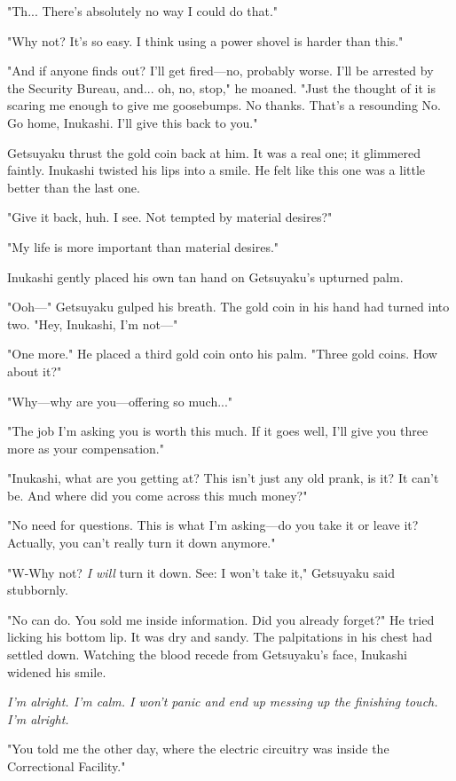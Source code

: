 "Th... There's absolutely no way I could do that."

"Why not? It's so easy. I think using a power shovel is harder than
this."

"And if anyone finds out? I'll get fired---no, probably worse. I'll be
arrested by the Security Bureau, and... oh, no, stop," he moaned. "Just
the thought of it is scaring me enough to give me goosebumps. No thanks.
That's a resounding No. Go home, Inukashi. I'll give this back to you."

Getsuyaku thrust the gold coin back at him. It was a real one; it
glimmered faintly. Inukashi twisted his lips into a smile. He felt like
this one was a little better than the last one.

"Give it back, huh. I see. Not tempted by material desires?"

"My life is more important than material desires."

Inukashi gently placed his own tan hand on Getsuyaku's upturned palm.

"Ooh---" Getsuyaku gulped his breath. The gold coin in his hand had turned
into two. "Hey, Inukashi, I'm not---"

"One more." He placed a third gold coin onto his palm. "Three gold
coins. How about it?"

"Why---why are you---offering so much..."

"The job I'm asking you is worth this much. If it goes well, I'll give
you three more as your compensation."

"Inukashi, what are you getting at? This isn't just any old prank, is
it? It can't be. And where did you come across this much money?"

"No need for questions. This is what I'm asking---do you take it or leave
it? Actually, you can't really turn it down anymore."

"W-Why not? \emph{I will} turn it down. See: I won't take it," Getsuyaku said
stubbornly.

"No can do. You sold me inside information. Did you already forget?" He
tried licking his bottom lip. It was dry and sandy. The palpitations in
his chest had settled down. Watching the blood recede from Getsuyaku's
face, Inukashi widened his smile.

\emph{I'm alright. I'm calm. I won't panic and end up messing up the finishing
touch. I'm alright.}

"You told me the other day, where the electric circuitry was inside the
Correctional Facility."

